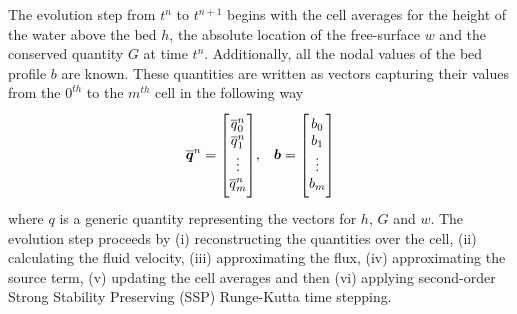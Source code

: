 The evolution step from $t^n$ to $t^{n+1}$ begins with the cell averages for the height of the water above the bed $h$, the absolute location of the free-surface $w$ and the conserved quantity $G$ at time $t^n$. Additionally, all the nodal values of the bed profile $b$ are known. These quantities are written as vectors capturing their values from the $0^{th}$ to the $m^{th}$ cell in the following way
\begin{align*} \overline{\vecn{q}}^n = \begin{bmatrix} \TM
\overline{q}_0^n \\\overline{q}_1^n \\ \vdots \\ \overline{q}_m^n \BM\end{bmatrix} & , & \vecn{b} = \begin{bmatrix} \TM
b_{0} \\ b_{1} \\ \vdots \\b_{m} \BM
\end{bmatrix} \\
\end{align*}
where $q$ is a generic quantity representing the vectors for $h$, $G$ and $w$. The evolution step proceeds by (i) reconstructing the quantities over the cell, (ii) calculating the fluid velocity, (iii) approximating the flux, (iv) approximating the source term, (v) updating the cell averages and then (vi) applying second-order Strong Stability Preserving (SSP) Runge-Kutta time stepping.

